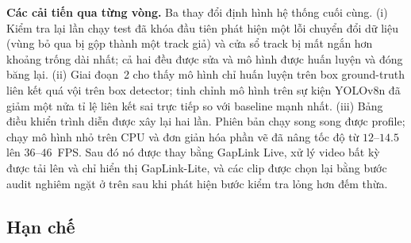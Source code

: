 \textbf{Các cải tiến qua từng vòng.} Ba thay đổi định hình hệ thống cuối cùng. (i) Kiểm tra lại lần chạy test đã khóa đầu tiên phát hiện một lỗi chuyển đổi dữ liệu (vùng bỏ qua bị gộp thành một track giả) và cửa sổ track bị mất ngắn hơn khoảng trống dài nhất; cả hai đều được sửa và mô hình được huấn luyện và đóng băng lại. (ii) Giai đoạn~2 cho thấy mô hình chỉ huấn luyện trên box ground-truth liên kết quá vội trên box detector; tinh chỉnh mô hình trên sự kiện YOLOv8n đã giảm một nửa tỉ lệ liên kết sai trực tiếp so với baseline mạnh nhất. (iii) Bảng điều khiển trình diễn được xây lại hai lần. Phiên bản chạy song song được profile; chạy mô hình nhỏ trên CPU và đơn giản hóa phần vẽ đã nâng tốc độ từ $12$--$14.5$ lên $36$--$46$~FPS. Sau đó nó được thay bằng GapLink Live, xử lý video bất kỳ được tải lên và chỉ hiển thị GapLink-Lite, và các clip được chọn lại bằng bước audit nghiêm ngặt ở trên sau khi phát hiện bước kiểm tra lỏng hơn đếm thừa.

\subsection{Hạn chế}
\label{sec:limitations}

